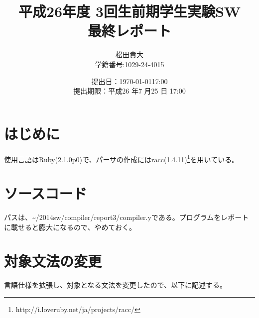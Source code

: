 \documentclass[titlepage, a4paper,12pt]{jarticle}
\title{平成26年度 3回生前期学生実験SW \\ 最終レポート}
\author{松田貴大 \\ \small{学籍番号:1029-24-4015}}
\date{提出日：\today 17:00 \\ 提出期限：平成26 年7 月25 日 17:00}
\begin{document}
\maketitle
\lstset{numbers=left,basicstyle=\small}
\section{はじめに}
使用言語はRuby(2.1.0p0)で、パーサの作成にはracc(1.4.11)\footnote{http://i.loveruby.net/ja/projects/racc/}を用いている。
\section{ソースコード}
\label{sec:source}
パスは、\~{}/2014sw/compiler/report3/compiler.yである。プログラムをレポートに載せると膨大になるので、やめておく。
\section{対象文法の変更}
言語仕様を拡張し、対象となる文法を変更したので、以下に記述する。
\end{document}
